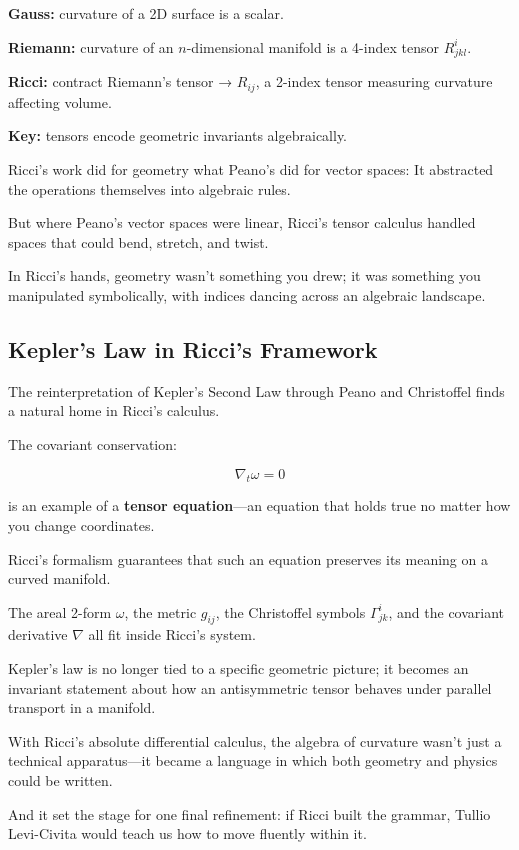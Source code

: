 \begin{tcolorbox}[colback=gray!5!white, colframe=black, title=\textbf{Sidebar: Ricci’s Tensor — Curvature as an Algebraic Object}, fonttitle=\bfseries, arc=1.5mm, boxrule=0.4pt]

\textbf{Gauss:} curvature of a 2D surface is a scalar.

\textbf{Riemann:} curvature of an \( n \)-dimensional manifold is a 4-index tensor \( R^i_{jkl} \).

\textbf{Ricci:} contract Riemann’s tensor → \( R_{ij} \), a 2-index tensor measuring curvature affecting volume.

\textbf{Key:} tensors encode geometric invariants algebraically.

\end{tcolorbox}

\bigskip

Ricci’s work did for geometry what Peano’s did for vector spaces:  
It abstracted the operations themselves into algebraic rules.

But where Peano’s vector spaces were linear, Ricci’s tensor calculus handled spaces that could bend, stretch, and twist.

In Ricci’s hands, geometry wasn’t something you drew; it was something you manipulated symbolically, with indices dancing across an algebraic landscape.

\bigskip

\subsection*{Kepler’s Law in Ricci’s Framework}

The reinterpretation of Kepler’s Second Law through Peano and Christoffel finds a natural home in Ricci’s calculus.

The covariant conservation:

\[
\nabla_t \omega = 0
\]

is an example of a \textbf{tensor equation}—an equation that holds true no matter how you change coordinates.

Ricci’s formalism guarantees that such an equation preserves its meaning on a curved manifold.

The areal 2-form \( \omega \), the metric \( g_{ij} \), the Christoffel symbols \( \Gamma^i_{jk} \), and the covariant derivative \( \nabla \) all fit inside Ricci’s system.

Kepler’s law is no longer tied to a specific geometric picture; it becomes an invariant statement about how an antisymmetric tensor behaves under parallel transport in a manifold.

\bigskip

With Ricci’s absolute differential calculus, the algebra of curvature wasn’t just a technical apparatus—it became a language in which both geometry and physics could be written.

And it set the stage for one final refinement:  
if Ricci built the grammar, Tullio Levi-Civita would teach us how to move fluently within it.
